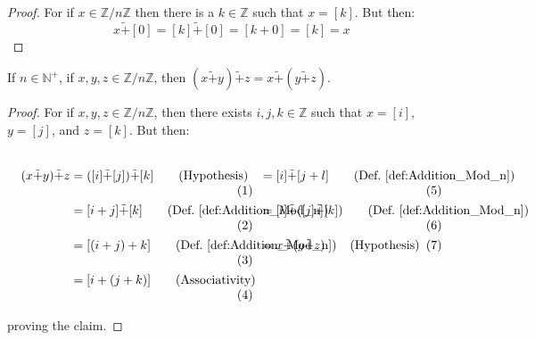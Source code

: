    \begin{proof}
        For if $x\in\mathbb{Z}/n\mathbb{Z}$ then there is a
        $k\in\mathbb{Z}$ such that $x=[k]$. But then:
        \begin{equation}
            x\tilde{+}[0]=[k]\tilde{+}[0]=[k+0]=[k]=x
        \end{equation}
    \end{proof}
    \begin{theorem}
        \label{thm:Mod_Add_is_Assoc}%
        If $n\in\mathbb{N}^{+}$, if $x,y,z\in\mathbb{Z}/n\mathbb{Z}$,
        then $(x\tilde{+}y)\tilde{+}z=x\tilde{+}(y\tilde{+}z)$.
    \end{theorem}
    \begin{proof}
        For if $x,y,z\in\mathbb{Z}/n\mathbb{Z}$, then there exists
        $i,j,k\in\mathbb{Z}$ such that $x=[i]$, $y=[j]$, and $z=[k]$.
        But then:
        \par
        \begin{subequations}
            \begin{minipage}[t]{0.54\textwidth}
                \centering
                \begin{align}
                    (x\tilde{+}y)\tilde{+}z
                    &=([i]\tilde{+}[j])\tilde{+}[k]
                        \tag{Hypothesis}\\
                    &=[i+j]\tilde{+}[k]
                        \tag{Def.~\ref{def:Addition_Mod_n}}\\
                    &=[(i+j)+k]
                        \tag{Def.~\ref{def:Addition_Mod_n}}\\
                    &=[i+(j+k)]
                        \tag{Associativity}
                \end{align}
            \end{minipage}
            \hfill
            \begin{minipage}[t]{0.44\textwidth}
                \begin{align}
                    &=[i]\tilde{+}[j+l]
                        \tag{Def.~\ref{def:Addition_Mod_n}}\\
                    &=[i]\tilde{+}([j]\tilde{+}[k])
                        \tag{Def.~\ref{def:Addition_Mod_n}}\\
                    &=x\tilde{+}(y\tilde{+}z)
                        \tag{Hypothesis}
                \end{align}
            \end{minipage}
        \end{subequations}
        \par\vspace{2.5ex}
        proving the claim.
    \end{proof}
